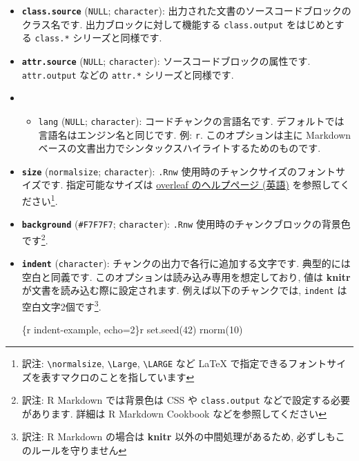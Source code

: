 \documentclass[
  lualatex,ja=standard,jafont=noto-otf]{bxjsreport}
\newenvironment{Shaded}{\begin{snugshade}}{\end{snugshade}}
\newcommand{\NormalTok}[1]{#1}
\providecommand{\tightlist}{%
  \setlength{\itemsep}{0pt}\setlength{\parskip}{0pt}}
\begin{document}
\begin{itemize}
  ソースコードをシンタックスハイライトするかどうかです\footnote{訳注: R
    Markdown ではさらに, YAML
    フロントマターで適用するハイライトのテーマ名を指定できます}.
\item
  \textbf{\texttt{class.source}} (\texttt{NULL}; \texttt{character}):
  出力された文書のソースコードブロックのクラス名です.
  出力ブロックに対して機能する \texttt{class.output} をはじめとする
  \texttt{class.*} シリーズと同様です.
\item
  \textbf{\texttt{attr.source}} (\texttt{NULL}; \texttt{character}):
  ソースコードブロックの属性です. \texttt{attr.output} などの
  \texttt{attr.*} シリーズと同様です.
\item
  \begin{itemize}
  \tightlist
  \item
    \texttt{lang} (\texttt{NULL}; \texttt{character}):
    コードチャンクの言語名です.
    デフォルトでは言語名はエンジン名と同じです. 例: \texttt{r}.
    このオプションは主に Markdown
    ベースの文書出力でシンタックスハイライトするためのものです.
  \end{itemize}
\item
  \textbf{\texttt{size}}
  (\texttt{\textquotesingle{}normalsize\textquotesingle{}};
  \texttt{character}): \texttt{.Rnw}
  使用時のチャンクサイズのフォントサイズです. 指定可能なサイズは
  \href{https://www.overleaf.com/learn/latex/Font_sizes,_families,_and_styles}{overleaf
  のヘルプページ (英語)} を参照してください\footnote{訳注:
    \texttt{\textbackslash{}normalsize}, \texttt{\textbackslash{}Large},
    \texttt{\textbackslash{}LARGE} など LaTeX
    で指定できるフォントサイズを表すマクロのことを指しています}.
\item
  \textbf{\texttt{background}}
  (\texttt{\textquotesingle{}\#F7F7F7\textquotesingle{}};
  \texttt{character}): \texttt{.Rnw}
  使用時のチャンクブロックの背景色です\footnote{訳注: R Markdown
    では背景色は CSS や \texttt{class.output}
    などで設定する必要があります. 詳細は R Markdown Cookbook
    などを参照してください}.
\item
  \textbf{\texttt{indent}} (\texttt{character}):
  チャンクの出力で各行に追加する文字です. 典型的には空白と同義です.
  このオプションは読み込み専用を想定しており, 値は \textbf{knitr}
  が文書を読み込む際に設定されます. 例えば以下のチャンクでは,
  \texttt{indent} は空白文字2個です\footnote{訳注: R Markdown の場合は
    \textbf{knitr} 以外の中間処理があるため,
    必ずしもこのルールを守りません}.

\begin{Shaded}
\begin{Highlighting}[numbers=left,,]
\NormalTok{\textasciigrave{}\textasciigrave{}\textasciigrave{}\{r indent{-}example, echo=2\}\textasciigrave{}r \textquotesingle{}\textquotesingle{}\textasciigrave{}}
\NormalTok{set.seed(42)}
\NormalTok{rnorm(10)}
\NormalTok{\textasciigrave{}\textasciigrave{}\textasciigrave{}}
\end{Highlighting}
\end{Shaded}


\end{itemize}
\end{document}

